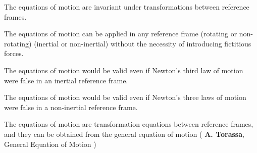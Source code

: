 \documentclass[10pt]{article}
\begin{document}
\par The equations of motion are invariant under transformations between reference frames.
\bigskip
\par The equations of motion can be applied in any reference frame (rotating or non-rotating) (inertial or non-inertial) without the necessity of introducing fictitious forces.
\bigskip
\par The equations of motion would be valid even if Newton's third law of motion were false in an inertial reference frame.
\bigskip
\par The equations of motion would be valid even if Newton's three laws of motion were false in a non-inertial reference frame.
\bigskip
\par The equations of motion are transformation equations between reference frames, and they can be obtained from the general equation of motion ( \hspace{-0.45em} \textbf{A. Torassa}, General Equation of Motion \hspace{-0.45em} )
\end{document}
